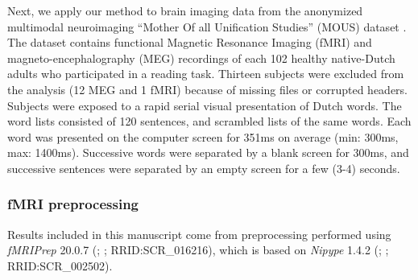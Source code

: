
Next, we apply our method to brain imaging data from the anonymized multimodal
neuroimaging ``Mother Of all Unification Studies'' (MOUS) dataset
\citep{schoffelen2019204}. The dataset contains functional Magnetic Resonance
Imaging (fMRI) and magneto-encephalography (MEG)
recordings of each 102 healthy native-Dutch adults who participated in a reading
task. Thirteen subjects were excluded from the analysis (12 MEG and 1 fMRI)
because of missing files or corrupted headers.
%
Subjects were exposed to a rapid serial visual presentation of Dutch words. The
word lists consisted of 120 sentences, and scrambled lists of the same words.
Each word was presented on the computer screen for 351ms on average (min: 300ms,
max: 1400ms). Successive words were separated by a blank screen for 300ms, and
successive sentences were separated by an empty screen for a few (3-4) seconds.

\subsubsection{fMRI preprocessing}
Results included in this manuscript come from preprocessing performed
using \emph{fMRIPrep} 20.0.7 (\citet{fmriprep1}; \citet{fmriprep2};
RRID:SCR\_016216), which is based on \emph{Nipype} 1.4.2
(\citet{nipype1}; \citet{nipype2}; RRID:SCR\_002502).

